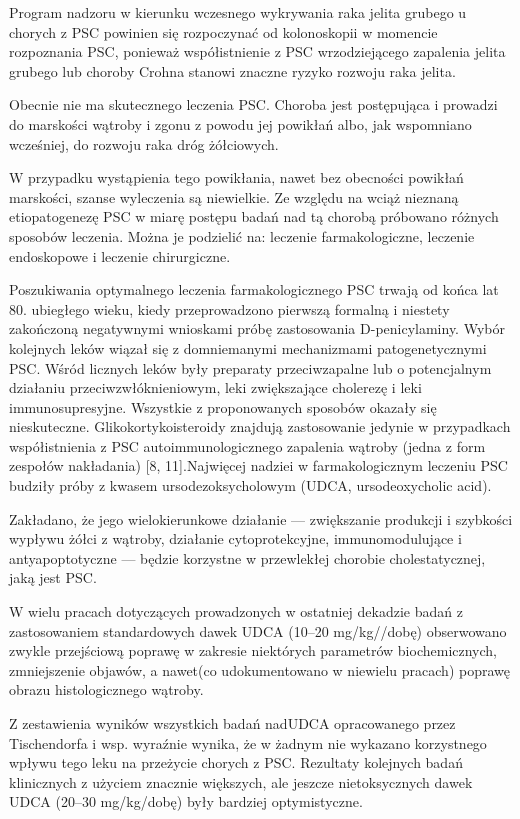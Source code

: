 Program nadzoru  w  kierunku  wczesnego  wykrywania raka jelita grubego u chorych z PSC powinien się rozpoczynać od kolonoskopii w momencie rozpoznania  PSC,  ponieważ  współistnienie z PSC wrzodziejącego zapalenia jelita grubego lub choroby Crohna stanowi znaczne ryzyko rozwoju raka jelita.

Obecnie  nie  ma  skutecznego  leczenia PSC. 
Choroba jest postępująca i prowadzi do marskości  wątroby  i  zgonu  z  powodu  jej  powikłań  albo,  jak  wspomniano  wcześniej,  do rozwoju  raka  dróg  żółciowych.  

W  przypadku wystąpienia tego powikłania, nawet bez obecności  powikłań  marskości,  szanse  wyleczenia są  niewielkie.  
Ze  względu  na  wciąż  nieznaną etiopatogenezę  PSC  w  miarę  postępu  badań nad tą chorobą próbowano różnych sposobów leczenia. 
Można je podzielić na: leczenie farmakologiczne, leczenie endoskopowe i leczenie  chirurgiczne.

Poszukiwania optymalnego leczenia farmakologicznego PSC trwają od końca lat 80. ubiegłego  wieku,  kiedy  przeprowadzono pierwszą  formalną  i  niestety  zakończoną  negatywnymi  wnioskami  próbę  zastosowania D-penicylaminy. 
Wybór kolejnych leków wiązał  się  z  domniemanymi  mechanizmami patogenetycznymi PSC. 
Wśród licznych leków były preparaty przeciwzapalne lub o potencjalnym  działaniu  przeciwzwłóknieniowym,  leki zwiększające cholerezę i leki immunosupresyjne. 
Wszystkie z proponowanych sposobów  okazały  się  nieskuteczne.  
Glikokortykoisteroidy  znajdują  zastosowanie  jedynie w przypadkach współistnienia z PSC autoimmunologicznego  zapalenia  wątroby  (jedna z form zespołów nakładania) [8, 11].Najwięcej  nadziei  w  farmakologicznym leczeniu PSC budziły próby z kwasem ursodezoksycholowym  (UDCA,  ursodeoxycholic acid).  

Zakładano,  że  jego  wielokierunkowe działanie  —  zwiększanie  produkcji  i  szybkości wypływu żółci z wątroby, działanie cytoprotekcyjne,  immunomodulujące  i  antyapoptotyczne — będzie korzystne w przewlekłej chorobie  cholestatycznej,  jaką  jest  PSC.

W  wielu  pracach  dotyczących  prowadzonych w  ostatniej  dekadzie  badań  z  zastosowaniem standardowych  dawek  UDCA  (10–20  mg/kg//dobę)  obserwowano  zwykle  przejściową  poprawę w zakresie niektórych parametrów biochemicznych, zmniejszenie objawów, a nawet(co  udokumentowano  w  niewielu  pracach) poprawę  obrazu  histologicznego  wątroby.

Z zestawienia wyników wszystkich badań nadUDCA  opracowanego  przez  Tischendorfa i wsp. wyraźnie wynika, że w żadnym nie wykazano korzystnego wpływu tego leku na przeżycie  chorych  z  PSC.  
Rezultaty  kolejnych badań  klinicznych  z  użyciem  znacznie  większych,  ale  jeszcze  nietoksycznych  dawek UDCA (20–30 mg/kg/dobę) były bardziej optymistyczne. 

